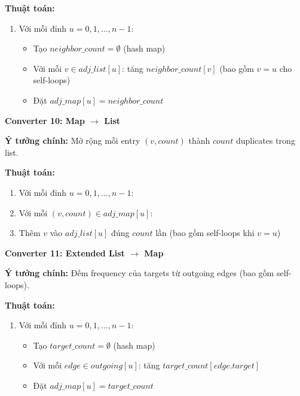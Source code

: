 \documentclass[12pt,a4paper]{article}
\begin{document}
\textbf{Thuật toán:}
\begin{enumerate}
    \item Với mỗi đỉnh $u = 0, 1, \ldots, n-1$:
    \begin{itemize}
        \item Tạo $neighbor\_count = \emptyset$ (hash map)
        \item Với mỗi $v \in adj\_list[u]$: tăng $neighbor\_count[v]$ (bao gồm $v = u$ cho self-loops)
        \item Đặt $adj\_map[u] = neighbor\_count$
    \end{itemize}
\end{enumerate}


\vspace{0.5cm}

\textbf{Converter 10: Map $\rightarrow$ List}

\textbf{Ý tưởng chính:} Mở rộng mỗi entry $(v, count)$ thành $count$ duplicates trong list.

\textbf{Thuật toán:}
\begin{enumerate}
    \item Với mỗi đỉnh $u = 0, 1, \ldots, n-1$:
    \item Với mỗi $(v, count) \in adj\_map[u]$:
    \item Thêm $v$ vào $adj\_list[u]$ đúng $count$ lần (bao gồm self-loops khi $v = u$)
\end{enumerate}


\vspace{0.5cm}

\textbf{Converter 11: Extended List $\rightarrow$ Map}

\textbf{Ý tưởng chính:} Đếm frequency của targets từ outgoing edges (bao gồm self-loops).

\textbf{Thuật toán:}
\begin{enumerate}
    \item Với mỗi đỉnh $u = 0, 1, \ldots, n-1$:
    \begin{itemize}
        \item Tạo $target\_count = \emptyset$ (hash map)
        \item Với mỗi $edge \in outgoing[u]$: tăng $target\_count[edge.target]$
        \item Đặt $adj\_map[u] = target\_count$
    \end{itemize}
\end{enumerate}


\vspace{0.5cm}
\end{document}

